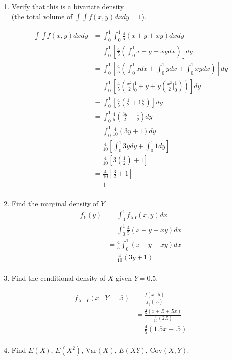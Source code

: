 \documentclass{tufte-book}
\newcommand{\Var}{\mathrm{Var}}
\newcommand{\Cov}{\mathrm{Cov}}
\theoremstyle{mytheoremstyle}
\theoremstyle{mylemstyle}
\theoremstyle{mydefstyle}
\begin{document}
\begin{enumerate}

\item Verify that this is a bivariate density\\
(the total volume of $\int\int f(x,y)dxdy =1$).

\begin{align*}
\int \int f(x,y)dxdy &= \int_0^1 \int_0^1 \frac{4}{5}(x+y+xy)dxdy\\
&= \int_0^1 [\frac{4}{5} (\int_0^1 x+y+xy dx)]dy\\
&= \int_0^1 [\frac{4}{5} (\int_0^1 xdx + \int_0^1ydx + \int_0^1 xydx)]dy\\
&= \int_0^1 [\frac{4}{5} (\frac{x^2}{2}\big|_0^1 + y + y(\frac{x^2}{2}\big|_0^1))]dy\\
&= \int_0^1 [\frac{4}{5} (\frac{1}{2} + 1 \frac{y}{2})]dy\\
&= \int_0^1 \frac{4}{5}(\frac{3y}{2} + \frac{1}{2})dy\\
&= \int_0^1 \frac{4}{10}(3y + 1) dy\\
&= \frac{4}{10} [\int_0^1 3ydy + \int_0^1 1 dy]\\
&= \frac{4}{10} [3(\frac{1}{2}) + 1]\\
&= \frac{4}{10} [\frac{3}{2} + 1]\\
&= 1\\
\end{align*}

\item Find the marginal density of $Y$
\begin{align*}
f_Y(y) &= \int_0^1 f_{XY}(x,y)dx\\
&= \int_0^1 \frac{4}{5}(x+y+xy)dx\\
&= \frac{4}{5} \int_0^1(x+y+xy)dx\\
&= \frac{4}{10}(3y+1)\\
\end{align*}

\item Find the conditional density of $X$ given $Y=0.5$.

\begin{align*}
f_{X\mid Y}(x \mid Y=.5) &= \frac{f(x,.5)}{f_y(.5)}\\
&= \frac{\frac{4}{5}(x + .5 +.5x)}{\frac{4}{10}(2.5)}\\
&= \frac{4}{5}(1.5x + .5)\\
\end{align*}

\item Find $E(X)$, $E(X^2)$, $\Var(X)$, $E(XY)$, $\Cov(X,Y)$.


\end{enumerate}
\end{document}
